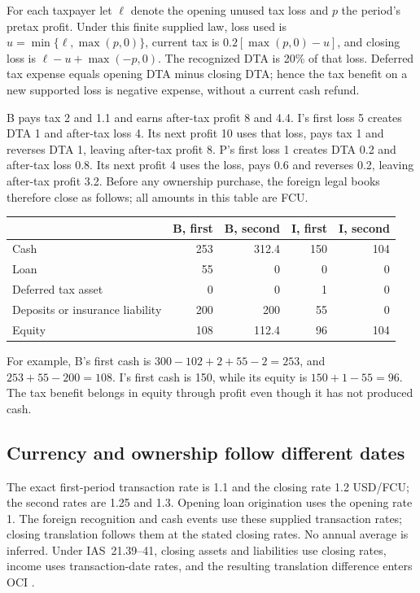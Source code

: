 For each taxpayer let \(\ell\) denote the opening unused tax loss and \(p\)
the period's pretax profit. Under this finite supplied law, loss used is
\(u=\min\{\ell,\max(p,0)\}\), current tax is
\(0.2[\max(p,0)-u]\), and closing loss is
\(\ell-u+\max(-p,0)\). The recognized DTA is 20\% of that loss. Deferred
tax expense equals opening DTA minus closing DTA; hence the tax benefit on a
new supported loss is negative expense, without a current cash refund.

B pays tax 2 and 1.1 and earns after-tax profit 8 and 4.4. I's first loss 5 creates
DTA 1 and after-tax loss 4. Its next profit 10 uses that loss, pays tax 1 and
reverses DTA 1, leaving after-tax profit 8. P's first loss 1 creates DTA 0.2 and
after-tax loss 0.8. Its next profit 4 uses the loss, pays 0.6 and reverses 0.2,
leaving after-tax profit 3.2. Before any ownership purchase, the foreign legal
books therefore close as follows; all amounts in this table are FCU.

\begin{center}
\begin{tabular}{lrrrr}
\toprule & B, first & B, second & I, first & I, second\\\midrule
Cash &253&312.4&150&104\\
Loan &55&0&0&0\\
Deferred tax asset &0&0&1&0\\
Deposits or insurance liability &200&200&55&0\\
Equity &108&112.4&96&104\\\bottomrule
\end{tabular}
\end{center}
For example, B's first cash is \(300-102+2+55-2=253\), and
\(253+55-200=108\). I's first cash is 150, while its equity is
\(150+1-55=96\). The tax benefit belongs in equity through profit even
though it has not produced cash.

\subsection{Currency and ownership follow different dates}

The exact first-period transaction rate is 1.1 and the closing rate 1.2 USD/FCU;
the second rates are 1.25 and 1.3. Opening loan origination uses the opening
rate 1. The foreign recognition and cash events use these supplied transaction rates; closing translation follows them at the stated closing rates. No annual average is inferred. Under
IAS~21.39--41, closing assets and liabilities use closing rates, income uses
transaction-date rates, and the resulting translation difference enters OCI
\citep{eu20231803}.

